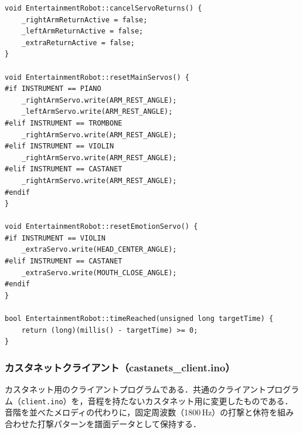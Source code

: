 \begin{lstlisting}
void EntertainmentRobot::cancelServoReturns() {
    _rightArmReturnActive = false;
    _leftArmReturnActive = false;
    _extraReturnActive = false;
}

void EntertainmentRobot::resetMainServos() {
#if INSTRUMENT == PIANO
    _rightArmServo.write(ARM_REST_ANGLE);
    _leftArmServo.write(ARM_REST_ANGLE);
#elif INSTRUMENT == TROMBONE
    _rightArmServo.write(ARM_REST_ANGLE);
#elif INSTRUMENT == VIOLIN
    _rightArmServo.write(ARM_REST_ANGLE);
#elif INSTRUMENT == CASTANET
    _rightArmServo.write(ARM_REST_ANGLE);
#endif
}

void EntertainmentRobot::resetEmotionServo() {
#if INSTRUMENT == VIOLIN
    _extraServo.write(HEAD_CENTER_ANGLE);
#elif INSTRUMENT == CASTANET
    _extraServo.write(MOUTH_CLOSE_ANGLE);
#endif
}

bool EntertainmentRobot::timeReached(unsigned long targetTime) {
    return (long)(millis() - targetTime) >= 0;
}
\end{lstlisting}

\subsubsection{カスタネットクライアント（castanets\_client.ino）}
カスタネット用のクライアントプログラムである．共通のクライアントプログラム（\texttt{client.ino}）を，音程を持たないカスタネット用に変更したものである．音階を並べたメロディの代わりに，固定周波数（1800\,Hz）の打撃と休符を組み合わせた打撃パターンを譜面データとして保持する．

